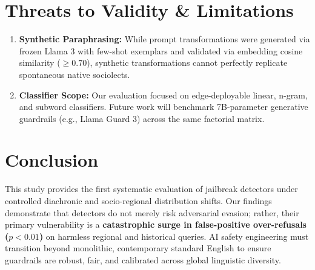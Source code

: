 \documentclass[11pt,a4paper]{article}
\begin{document}
\section{Threats to Validity \& Limitations}
\label{sec:limitations}
\begin{enumerate}
    \item \textbf{Synthetic Paraphrasing:} While prompt transformations were generated via frozen Llama 3 with few-shot exemplars and validated via embedding cosine similarity ($\ge 0.70$), synthetic transformations cannot perfectly replicate spontaneous native sociolects.
    \item \textbf{Classifier Scope:} Our evaluation focused on edge-deployable linear, n-gram, and subword classifiers. Future work will benchmark 7B-parameter generative guardrails (e.g., Llama Guard 3) across the same factorial matrix.
\end{enumerate}

\section{Conclusion}
\label{sec:conclusion}
This study provides the first systematic evaluation of jailbreak detectors under controlled diachronic and socio-regional distribution shifts. Our findings demonstrate that detectors do not merely risk adversarial evasion; rather, their primary vulnerability is a \textbf{catastrophic surge in false-positive over-refusals ($p < 0.01$)} on harmless regional and historical queries. AI safety engineering must transition beyond monolithic, contemporary standard English to ensure guardrails are robust, fair, and calibrated across global linguistic diversity.



\end{document}
